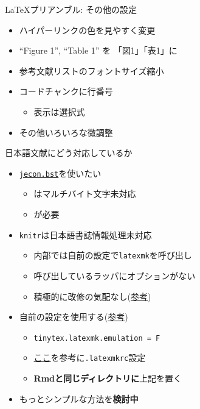 \documentclass[14pt,ignorenonframetext,]{beamer}
\providecommand{\tightlist}{%
  \setlength{\itemsep}{0pt}\setlength{\parskip}{0pt}}
\begin{document}
\begin{frame}{\LaTeX プリアンブル: その他の設定}
\protect\hypertarget{ux30d7ux30eaux30a2ux30f3ux30d6ux30eb-ux305dux306eux4ed6ux306eux8a2dux5b9a}{}

\begin{itemize}
\tightlist
\item
  ハイパーリンクの色を見やすく変更
\item
  ``Figure 1'', ``Table 1'' を 「図1」「表1」に
\item
  参考文献リストのフォントサイズ縮小
\item
  コードチャンクに行番号

  \begin{itemize}
  \tightlist
  \item
    表示は選択式
  \end{itemize}
\item
  その他いろいろな微調整
\end{itemize}

\end{frame}

\begin{frame}[fragile]{日本語文献にどう対応しているか}
\protect\hypertarget{ux65e5ux672cux8a9eux6587ux732eux306bux3069ux3046ux5bfeux5fdcux3057ux3066ux3044ux308bux304b}{}

\begin{itemize}
\tightlist
\item
  \href{https://github.com/ShiroTakeda/jecon-bst/blob/master/jecon.bst}{\texttt{jecon.bst}}を使いたい

  \begin{itemize}
  \tightlist
  \item
    \BibTeX はマルチバイト文字未対応
  \item
    \upBibTeX が必要
  \end{itemize}
\item
  \texttt{knitr}は日本語書誌情報処理未対応

  \begin{itemize}
  \tightlist
  \item
    内部では自前の設定で\texttt{latexmk}を呼び出し
  \item
    呼び出しているラッパにオプションがない
  \item
    積極的に改修の気配なし(\href{https://github.com/yihui/tinytex/issues/70}{参考})
  \end{itemize}
\item
  自前の設定を使用する(\href{https://github.com/kenjimyzk/bookdown_ja_template}{参考})

  \begin{itemize}
  \tightlist
  \item
    \texttt{tinytex.latexmk.emulation\ =\ F}
  \item
    \href{https://texwiki.texjp.org/?Latexmk}{ここ}を参考に\texttt{.latexmkrc}設定
  \item
    \textbf{Rmdと同じディレクトリに}上記を置く
  \end{itemize}
\item
  もっとシンプルな方法を\textbf{検討中}
\end{itemize}

\end{frame}
\end{document}
